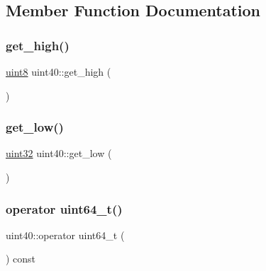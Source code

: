\subsection{Member Function Documentation}
\mbox{\label{classuint40_ac08ecc53d6ae5d245218a768c3ac105c}} 
\subsubsection{\texorpdfstring{get\+\_\+high()}{get\_high()}}
{\footnotesize\ttfamily \hyperlink{types_8h_a115946cb5fc5879545e9ccea096a6031}{uint8} uint40\+::get\+\_\+high (\begin{DoxyParamCaption}{ }\end{DoxyParamCaption})\hspace{0.3cm}{\ttfamily [inline]}}

\mbox{\label{classuint40_a0037fdf484bb069add9d9ee8c65dbc17}} 
\subsubsection{\texorpdfstring{get\+\_\+low()}{get\_low()}}
{\footnotesize\ttfamily \hyperlink{types_8h_a8f95e75e58492e87412191fabadd8ca8}{uint32} uint40\+::get\+\_\+low (\begin{DoxyParamCaption}{ }\end{DoxyParamCaption})\hspace{0.3cm}{\ttfamily [inline]}}

\mbox{\label{classuint40_afca52041b179c0002070c33e7dd101a9}} 
\subsubsection{\texorpdfstring{operator uint64\+\_\+t()}{operator uint64\_t()}}
{\footnotesize\ttfamily uint40\+::operator uint64\+\_\+t (\begin{DoxyParamCaption}{ }\end{DoxyParamCaption}) const\hspace{0.3cm}{\ttfamily [inline]}}

